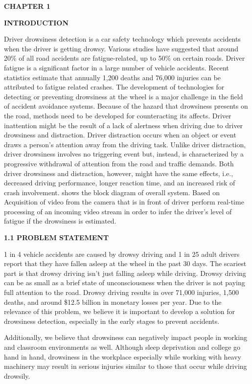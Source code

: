 \documentclass[a4paper,12pt]{article}
\begin{document}
\textbf{CHAPTER 1}

\textbf{INTRODUCTION}

Driver drowsiness detection is a car safety technology which prevents
accidents when the driver is getting drowsy. Various studies have
suggested that around 20\% of all road accidents are fatigue-related, up
to 50\% on certain roads. Driver fatigue is a significant factor in a
large number of vehicle accidents. Recent statistics estimate that
annually 1,200 deaths and 76,000 injuries can be attributed to fatigue
related crashes. The development of technologies for detecting or
preventing drowsiness at the wheel is a major challenge in the field of
accident avoidance systems. Because of the hazard that drowsiness
presents on the road, methods need to be developed for counteracting its
affects. Driver inattention might be the result of a lack of alertness
when driving due to driver drowsiness and distraction. Driver
distraction occurs when an object or event draws a person's attention
away from the driving task. Unlike driver distraction, driver drowsiness
involves no triggering event but, instead, is characterized by a
progressive withdrawal of attention from the road and traffic demands.
Both driver drowsiness and distraction, however, might have the same
effects, i.e., decreased driving performance, longer reaction time, and
an increased risk of crash involvement. shows the block diagram of
overall system. Based on Acquisition of video from the camera that is in
front of driver perform real-time processing of an incoming video stream
in order to infer the driver's level of fatigue if the drowsiness is
estimated.

\textbf{1.1 PROBLEM STATEMENT}

1 in 4 vehicle accidents are caused by drowsy driving and 1 in 25 adult
drivers report that they have fallen asleep at the wheel in the past 30
days. The scariest part is that drowsy driving isn't just falling asleep
while driving. Drowsy driving can be as small as a brief state of
unconsciousness when the driver is not paying full attention to the
road. Drowsy driving results in over 71,000 injuries, 1,500 deaths, and
around \$12.5 billion in monetary losses per year. Due to the relevance
of this problem, we believe it is important to develop a solution for
drowsiness detection, especially in the early stages to prevent
accidents.

Additionally, we believe that drowsiness can negatively impact people in
working and classroom environments as well. Although sleep deprivation
and college go hand in hand, drowsiness in the workplace especially
while working with heavy machinery may result in serious injuries
similar to those that occur while driving drowsily.
\end{document}
